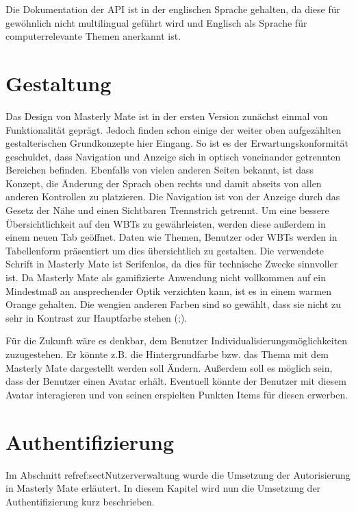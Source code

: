 Die Dokumentation der API ist in der englischen Sprache gehalten, da diese für
gewöhnlich nicht multilingual geführt wird und Englisch als Sprache für
computerrelevante Themen anerkannt ist.

\section{Gestaltung}
Das Design von Masterly Mate ist in der ersten Version zunächst einmal von
Funktionalität geprägt. Jedoch finden schon einige der weiter oben aufgezählten
gestalterischen Grundkonzepte hier Eingang. So ist es der Erwartungskonformität
geschuldet, dass Navigation und Anzeige sich in optisch voneinander getrennten
Bereichen befinden. Ebenfalls von vielen anderen Seiten bekannt, ist dass
Konzept, die Änderung der Sprach oben rechts und damit abseits von allen anderen
Kontrollen zu platzieren. Die Navigation ist von der Anzeige durch das Gesetz
der Nähe und einen Sichtbaren Trennstrich getrennt. Um eine bessere
Übersichtlichkeit auf den WBTs zu gewährleisten, werden diese außerdem in einem
neuen Tab geöffnet. Daten wie Themen, Benutzer oder WBTs werden in Tabellenform
präsentiert um dies übersichtlich zu gestalten. Die verwendete Schrift in
Masterly Mate ist Serifenlos, da dies für technische Zwecke sinnvoller ist. Da
Masterly Mate als gamifizierte Anwendung nicht vollkommen auf ein Mindestmaß an
ansprechender Optik verzichten kann, ist es in einem warmen Orange gehalten.
Die wengien anderen Farben sind so gewählt, dass sie nicht zu sehr in Kontrast
zur Hauptfarbe stehen (\cite{johnson:2000};\cite{nielsen:1995}).

Für die Zukunft wäre es denkbar, dem Benutzer Individualisierungsmöglichkeiten
zuzugestehen. Er könnte z.B. die Hintergrundfarbe bzw. das Thema mit dem
Masterly Mate dargestellt werden soll Ändern. Außerdem soll es möglich sein,
dass der Benutzer einen Avatar erhält. Eventuell könnte der Benutzer mit diesem
Avatar interagieren und von seinen erspielten Punkten Items für diesen erwerben. 
\newpage
\section{Authentifizierung}\label{ref:sectAuthentifizierung}
Im Abschnitt ref{ref:sectNutzerverwaltung} wurde die Umsetzung der Autorisierung
in Masterly Mate erläutert. In diesem Kapitel wird nun die Umsetzung der
Authentifizierung kurz beschrieben. 

